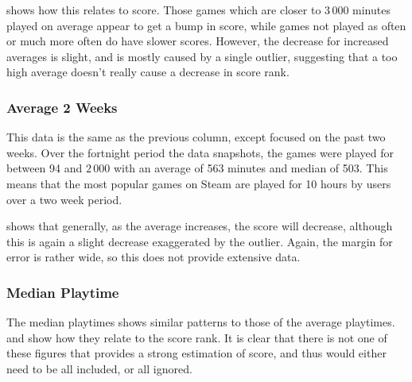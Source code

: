 \documentclass[dataset.tex]{subfiles}
\begin{document}
 shows how this relates to score. Those games which are
closer to \(3\,000\) minutes played on average appear to get a bump in score,
while games not played as often or much more often do have slower scores.
However, the decrease for increased averages is slight, and is mostly caused by
a single outlier, suggesting that a too high average doesn't really cause a
decrease in score rank.

\subsubsection{Average 2 Weeks} %
\label{ssub:average_2_weeks}
This data is the same as the previous column, except focused on the past two
weeks. Over the fortnight period the data snapshots, the games were played for
between 94 and \(2\,000\) with an average of 563 minutes and median of 503.
This means that the most popular games on Steam are played for 10 hours by users
over a two week period.

 shows that generally, as the average increases, the score
will decrease, although this is again a slight decrease exaggerated by the
outlier. Again, the margin for error is rather wide, so this does not provide
extensive data.

\subsubsection{Median Playtime} %
\label{ssub:median_playtime}
The median playtimes shows similar patterns to those of the average playtimes.
 and  show how they relate to the score
rank. It is clear that there is not one of these figures that provides a strong
estimation of score, and thus would either need to be all included, or all
ignored.
\end{document}
